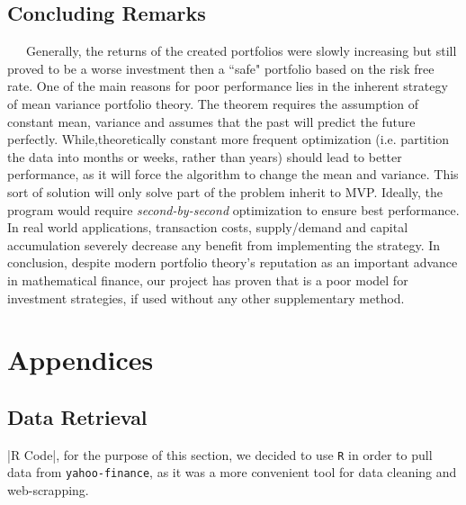 \documentclass[12pt,titlepage,letter]{article}
\begin{document}
	\subsection{Concluding Remarks}
		\ \ \ Generally, the returns of the created portfolios were slowly increasing but still proved to be a worse investment then a ``safe" portfolio based on the risk free rate. One of the main reasons for poor performance lies in the inherent strategy of mean variance portfolio theory. The theorem requires the assumption of constant mean, variance and assumes that the past will predict the future perfectly. While,theoretically constant more frequent optimization (i.e. partition the data into months or weeks, rather than years) should lead to better performance, as it will force the algorithm to change the mean and variance. This sort of solution will only solve part of the problem inherit to MVP. Ideally, the program would require \textit{second-by-second} optimization to ensure best performance. In real world applications, transaction costs, supply/demand and capital accumulation severely decrease any benefit from implementing the strategy.  In conclusion, despite modern portfolio theory's reputation as an important advance in mathematical finance, our project has proven that is a poor model for investment strategies, if used without any other supplementary method.
\newpage

\section{Appendices}
	\subsection{Data Retrieval}
	|R Code|, for the purpose of this section, we decided to use \verb|R| in order to pull data from \verb|yahoo-finance|, as it was a more convenient tool for data cleaning and web-scrapping.\\
	\\
\end{document}
